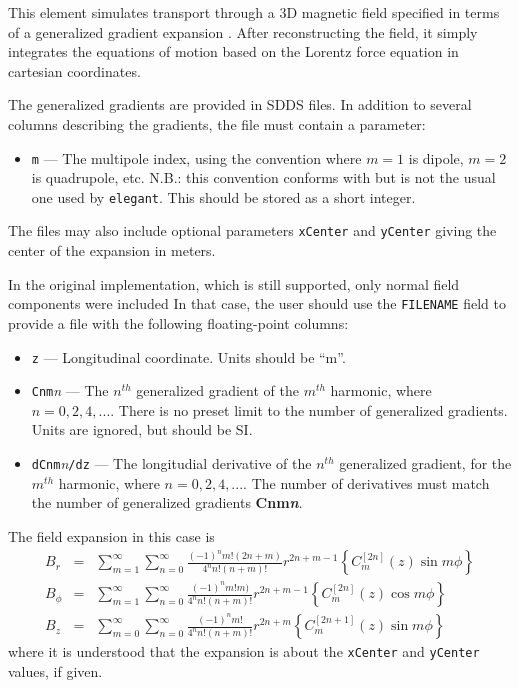 This element simulates transport through a 3D magnetic field
specified in terms of a generalized gradient expansion \cite{Venturini-NIMA427-387}.
After reconstructing the field, it simply integrates the equations of motion
based on the Lorentz force equation in cartesian coordinates.  

The generalized gradients are provided in SDDS files.
In addition to several columns describing the gradients, the file must contain a parameter:
\begin{itemize}
\item \verb|m| --- The multipole index, using the convention where $m=1$ is dipole, $m=2$ is quadrupole,
  etc. N.B.: this convention conforms with \cite{Venturini-NIMA427-387} but is not the usual one used by
  {\tt elegant}. This should be stored as a short integer.
\end{itemize}
The files may also include optional parameters \verb|xCenter| and \verb|yCenter| giving the center of the expansion
in meters.

In the original implementation, which is still supported, only normal field components were included
In that case, the user should use the \verb|FILENAME| field to provide a file 
with the following floating-point columns:
\begin{itemize}
\item \verb|z| --- Longitudinal coordinate. Units should be ``m''.
\item \verb|Cnm|{\em n} --- The $n^{th}$ generalized gradient of the $m^{th}$ harmonic, where $n=0,2,4,...$.
  There is no preset limit to the number of generalized gradients. Units are ignored,
  but should be SI.
\item \verb|dCnm|{\em n}\verb|/dz| --- The longitudial derivative of the $n^{th}$ generalized gradient, 
  for the $m^{th}$ harmonic, where $n=0,2,4,...$.
  The number of derivatives must match the number of generalized gradients {\bf Cnm{\em n}}.
\end{itemize}
The field expansion in this case is
\begin{equation}
\begin{array}{lcl}
B_r & = & \sum\limits_{m=1}^\infty \sum\limits_{n=0}^\infty \frac{(-1)^n m! (2n + m)}{4^n n! (n+m)!} r^{2 n + m-1}
\left\{C_m^{\left[2n\right]}(z) \sin m\phi\right\}  \\
B_\phi & = & \sum\limits_{m=1}^\infty \sum\limits_{n=0}^\infty \frac{(-1)^n m! m)}{4^n n! (n+m)!} r^{2 n + m-1}
\left\{C_m^{\left[2n\right]}(z) \cos m\phi\right\} \\
B_z & = & \sum\limits_{m=0}^\infty \sum\limits_{n=0}^\infty \frac{(-1)^n m!}{4^n n! (n+m)!} r^{2 n + m}
\left\{C_m^{\left[2n+1\right]}(z) \sin m\phi\right\}
\end{array}
\end{equation}
where it is understood that the expansion is about the {\tt xCenter} and {\tt yCenter} values, if given.

